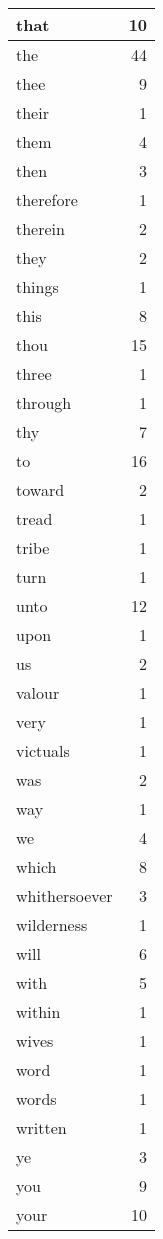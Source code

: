 \begin{center}
\begin{longtable}{l|r}
that & 10 \\ \hline
the & 44 \\ \hline
thee & 9 \\ \hline
their & 1 \\ \hline
them & 4 \\ \hline
then & 3 \\ \hline
therefore & 1 \\ \hline
therein & 2 \\ \hline
they & 2 \\ \hline
things & 1 \\ \hline
this & 8 \\ \hline
thou & 15 \\ \hline
three & 1 \\ \hline
through & 1 \\ \hline
thy & 7 \\ \hline
to & 16 \\ \hline
toward & 2 \\ \hline
tread & 1 \\ \hline
tribe & 1 \\ \hline
turn & 1 \\ \hline
unto & 12 \\ \hline
upon & 1 \\ \hline
us & 2 \\ \hline
valour & 1 \\ \hline
very & 1 \\ \hline
victuals & 1 \\ \hline
was & 2 \\ \hline
way & 1 \\ \hline
we & 4 \\ \hline
which & 8 \\ \hline
whithersoever & 3 \\ \hline
wilderness & 1 \\ \hline
will & 6 \\ \hline
with & 5 \\ \hline
within & 1 \\ \hline
wives & 1 \\ \hline
word & 1 \\ \hline
words & 1 \\ \hline
written & 1 \\ \hline
ye & 3 \\ \hline
you & 9 \\ \hline
your & 10 \\ \hline
\end{longtable}
\end{center}



